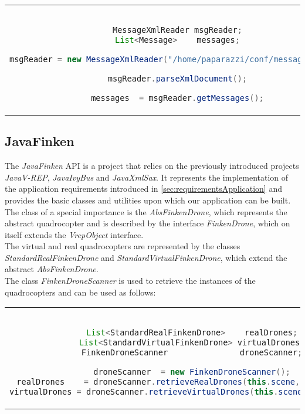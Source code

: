 \begin{center}
\begin{tabular}{c}
\begin{lstlisting}[basicstyle=\small, language=Java]

MessageXmlReader msgReader;
List<Message>    messages;

msgReader = new MessageXmlReader("/home/paparazzi/conf/messages.xml");

msgReader.parseXmlDocument();

messages  = msgReader.getMessages();

\end{lstlisting}
\end{tabular}
\end{center}


\subsection{JavaFinken}
\label{sec:javaFinkenImplementation}

The \textit{JavaFinken} API is a project that relies on the previously introduced projects \textit{JavaV-REP}, \textit{JavaIvyBus} and \textit{JavaXmlSax}. It represents the implementation of the application requirements introduced in \ref{sec:requirementsApplication} and provides the basic classes and utilities upon which our application can be built.\\

The class of a special importance is the \textit{AbsFinkenDrone}, which represents the abstract quadrocopter and is described by the interface \textit{FinkenDrone}, which on itself extends the \textit{VrepObject} interface.\\
The virtual and real quadrocopters are represented by the classes \textit{StandardRealFinkenDrone} and \textit{StandardVirtualFinkenDrone}, which extend the abstract \textit{AbsFinkenDrone}.\\
The class \textit{FinkenDroneScanner} is used to retrieve the instances of the quadrocopters and can be used as follows:

\begin{center}
\begin{tabular}{c}
\begin{lstlisting}[basicstyle=\small, language=Java]

List<StandardRealFinkenDrone>    realDrones;
List<StandardVirtualFinkenDrone> virtualDrones;
FinkenDroneScanner               droneScanner;

droneScanner  = new FinkenDroneScanner();
realDrones    = droneScanner.retrieveRealDrones(this.scene, this.client);
virtualDrones = droneScanner.retrieveVirtualDrones(this.scene, this.client);

\end{lstlisting}
\end{tabular}
\end{center}

